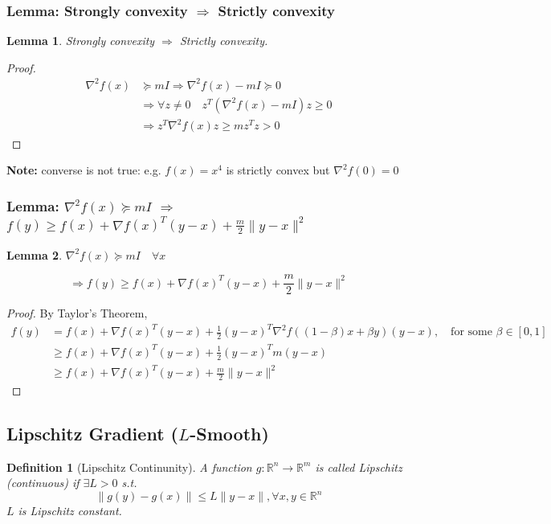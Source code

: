 \documentclass[11pt,a4paper]{article}
\newtheorem{definition}{Definition}
\newtheorem{lemma}{Lemma}
\begin{document}
\subsubsection{Lemma: Strongly convexity $\Rightarrow$ Strictly convexity}
\begin{lemma}
    Strongly convexity $\Rightarrow$ Strictly convexity.
\end{lemma}
\begin{proof}
\begin{equation}
    \begin{aligned}
        \nabla^2 f(x)&\succeq mI \Rightarrow \nabla^2 f(x)-mI\succeq 0\\
        & \Rightarrow \forall z\neq 0\quad z^T(\nabla^2 f(x)-mI)z\geq 0\\
        & \Rightarrow z^T\nabla^2 f(x)z\geq mz^Tz>0
    \end{aligned}
    \nonumber
\end{equation}
\end{proof}
\textbf{Note: }converse is not true: e.g. $f(x)=x^4$ is strictly convex but $\nabla^2 f(0)=0$

\subsubsection{Lemma: $\nabla^2 f(x)\succeq mI$ $\Rightarrow$ $f(y)\geq f(x)+\nabla f(x)^T(y-x)+\frac{m}{2}\|y-x\|^2$}
\begin{lemma}
$\nabla^2 f(x)\succeq mI\quad \forall x$

$$\Rightarrow f(y)\geq f(x)+\nabla f(x)^T(y-x)+\frac{m}{2}\|y-x\|^2$$
\end{lemma}
\begin{proof}
    By Taylor's Theorem,
    \begin{equation}
        \begin{aligned}
            f(y)&=f(x)+\nabla f(x)^T(y-x)+\frac{1}{2}(y-x)^T \nabla^2 f((1-\beta)x+\beta y)(y-x),\quad \text{for some }\beta\in[0,1]\\
            &\geq f(x)+\nabla f(x)^T(y-x)+\frac{1}{2}(y-x)^Tm(y-x)\\
            &\geq f(x)+\nabla f(x)^T(y-x)+\frac{m}{2}\|y-x\|^2
        \end{aligned}
        \nonumber
    \end{equation}
\end{proof}



\subsection{Lipschitz Gradient ($L$-Smooth)}
\begin{definition}[Lipschitz Continunity]
A function $g: \mathbb{R}^n \rightarrow	\mathbb{R}^m$ is called Lipschitz (continuous) if $\exists L>0$ s.t.
$$\|g(y)-g(x)\|\leq L\|y-x\|,\forall x,y\in \mathbb{R}^n$$
$L$ is Lipschitz constant.
\end{definition}
\end{document}
